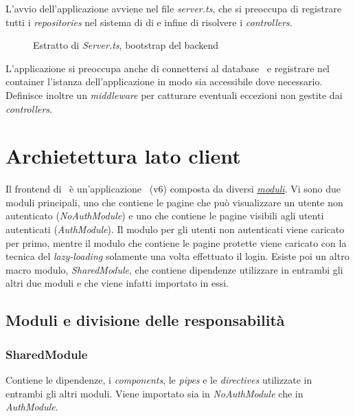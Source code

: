L'avvio dell'applicazione avviene nel file \textit{server.ts}, che si preoccupa di registrare tutti i \textit{repositories} nel sistema di \acrlong{di} e infine di risolvere i \textit{controllers}.
\begin{figure}[H] 
	\centering    
	
	\caption[Estratto di \textit{Server.ts}, bootstrap del \gls{backend}]{Estratto di \textit{Server.ts}, bootstrap del \gls{backend}}
	\label{fig:server-bootstrap}
\end{figure}

\noindent
L'applicazione si preoccupa anche di connettersi al database \mongodb~e registrare nel container l'istanza dell'applicazione in modo sia accessibile dove necessario. Definisce inoltre un \textit{middleware} per catturare eventuali eccezioni non gestite dai \textit{controllers}.

\pagebreak
\section{Archietettura lato client}

Il \gls{frontend} di \projectName~è un'applicazione \angular~(v6) composta da diversi \hyperref[chap:ngmodules]{\textit{moduli}}. Vi sono due moduli principali, uno che contiene le pagine che può visualizzare un utente non autenticato (\textit{NoAuthModule}) e uno che contiene le pagine visibili agli utenti autenticati (\textit{AuthModule}). Il modulo per gli utenti non autenticati viene caricato per primo, mentre il modulo che contiene le pagine protette viene caricato con la tecnica del \textit{lazy-loading} solamente una volta effettuato il login. Esiste poi un altro macro modulo, \textit{SharedModule}, che contiene dipendenze utilizzare in entrambi gli altri due moduli e che viene infatti importato in essi.

\subsection{Moduli e divisione delle responsabilità}
\label{client:modules}
\subsubsection{SharedModule}
\label{client:shared-module}
Contiene le dipendenze, i \textit{components}, le \textit{pipes} e le \textit{directives} utilizzate in entrambi gli altri moduli. Viene importato sia in \textit{NoAuthModule} che in \textit{AuthModule}.

